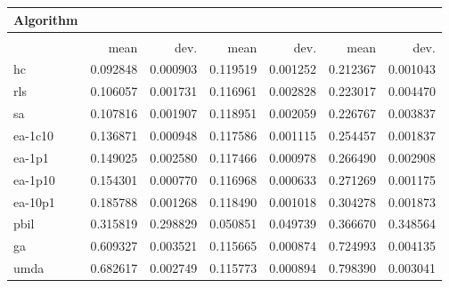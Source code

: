 \begin{tabular}{@{} l *{6}{>{{}}N{1}{2}} @{}}
\toprule
{Algorithm} &  \\
\midrule
&  &  &  \\
\midrule
& {mean} & {dev.} & {mean} & {dev.} & {mean} & {dev.} \\
\midrule
hc & 0.092848 & 0.000903 & 0.119519 & 0.001252 & 0.212367 & 0.001043 \\
rls & 0.106057 & 0.001731 & 0.116961 & 0.002828 & 0.223017 & 0.004470 \\
sa & 0.107816 & 0.001907 & 0.118951 & 0.002059 & 0.226767 & 0.003837 \\
ea-1c10 & 0.136871 & 0.000948 & 0.117586 & 0.001115 & 0.254457 & 0.001837 \\
ea-1p1 & 0.149025 & 0.002580 & 0.117466 & 0.000978 & 0.266490 & 0.002908 \\
ea-1p10 & 0.154301 & 0.000770 & 0.116968 & 0.000633 & 0.271269 & 0.001175 \\
ea-10p1 & 0.185788 & 0.001268 & 0.118490 & 0.001018 & 0.304278 & 0.001873 \\
pbil & 0.315819 & 0.298829 & 0.050851 & 0.049739 & 0.366670 & 0.348564 \\
ga & 0.609327 & 0.003521 & 0.115665 & 0.000874 & 0.724993 & 0.004135 \\
umda & 0.682617 & 0.002749 & 0.115773 & 0.000894 & 0.798390 & 0.003041 \\
\bottomrule
\end{tabular}
